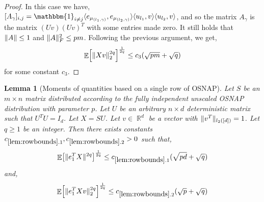 \documentclass[11pt]{amsart}
\numberwithin{equation}{section}
\numberwithin{equation}{section}
\DeclareMathOperator{\E}{\mathbb{E}}
\DeclareMathOperator{\R}{\mathbb{R}}
\DeclarePairedDelimiter{\norm}{\lVert}{\rVert}
\DeclarePairedDelimiter{\ip}{\langle}{\rangle}
\DeclarePairedDelimiter{\sqbr}{[}{]}
\newtheorem{lemma}[theorem]{Lemma}
\begin{document}
\begin{proof}
In this case we have, $[A_\gamma]_{i,j} =  \mathbbm{1}_{i \neq j} \ip{e_{\mu_{(l_1, \gamma)}}, e_{\mu_{(l_2, \gamma)}}} \ip{u_{l_1}, v} \ip{u_{l_2}, v} $, and so the matrix $A_\gamma$ is the matrix $(Uv)(Uv)^T$ with some entries made zero. It still holds that $\norm{A} \le 1$ and $\norm{A}_F^2 \le pm$. Following the previous argument, we get,
\[ \E \sqbr*{\norm{Xv}^{2q}_2}^\frac{1}{2q} \le c_3(\sqrt{pm} + \sqrt{q}) \]
for some constant $c_3$.


\end{proof}

\begin{lemma}[Moments of quantities based on a single row of OSNAP]\label{lem:rowbounds}
    Let $S$ be an $m \times n$ matrix distributed according to the fully independent unscaled OSNAP distribution with parameter $p$. Let $U$ be an arbitrary $n \times d$ deterministic matrix such that $U^TU=I_d$. Let $X=SU$. Let $v \in \R^d$ be a vector with $\norm{v^T}_{l_2([d])}=1$. Let $q \ge 1$ be an integer. Then there exists constants $c_{\ref{lem:rowbounds}.1}, c_{\ref{lem:rowbounds}.2} > 0$ such that,
    \[ \E \sqbr*{\norm{e_{1}^TX}^{2q}}^\frac{1}{2q} \le c_{\ref{lem:rowbounds}.1}(\sqrt{pd} + \sqrt{q}) \]
    and,
    \[ \E \sqbr*{\norm{e_{1}^TXv}^{2q}_2}^\frac{1}{2q} \le c_{\ref{lem:rowbounds}.2}(\sqrt{p} + \sqrt{q}) \]

\end{lemma}
\end{document}
